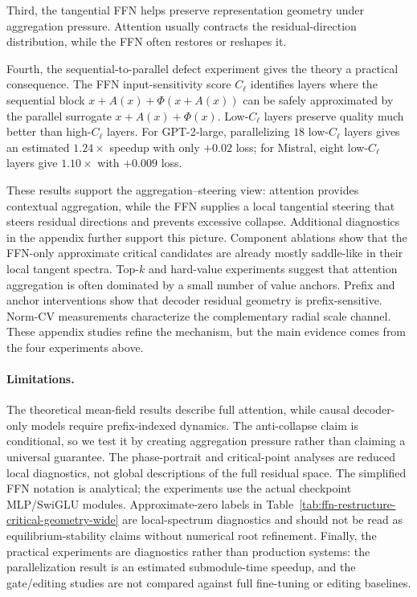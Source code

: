 \documentclass[11pt]{article}
\begin{document}
Third, the tangential FFN helps preserve representation geometry under
aggregation pressure. Attention usually contracts the residual-direction
distribution, while the FFN often restores or reshapes it.

Fourth, the sequential-to-parallel defect experiment gives the theory a practical
consequence. The FFN input-sensitivity score $C_\ell$ identifies layers where the
sequential block
$x+A(x)+\Phi(x+A(x))$ can be safely approximated by the parallel surrogate
$x+A(x)+\Phi(x)$. Low-$C_\ell$ layers preserve quality much better than
high-$C_\ell$ layers. For GPT-2-large, parallelizing $18$ low-$C_\ell$ layers
gives an estimated $1.24\times$ speedup with only $+0.02$ loss; for Mistral,
eight low-$C_\ell$ layers give $1.10\times$ with $+0.009$ loss.

These results support the aggregation--steering view: attention provides
contextual aggregation, while the FFN supplies a local tangential steering that
steers residual directions and prevents excessive collapse. Additional
diagnostics in the appendix further support this picture. Component ablations
show that the FFN-only approximate critical candidates are already mostly
saddle-like in their local tangent spectra. Top-$k$ and hard-value experiments suggest that
attention aggregation is often dominated by a small number of value anchors.
Prefix and anchor interventions show that decoder residual geometry is
prefix-sensitive. Norm-CV measurements characterize the complementary radial
scale channel. These appendix studies refine the mechanism, but the main
evidence comes from the four experiments above.

\paragraph{Limitations.}
The theoretical mean-field results describe full attention, while causal
decoder-only models require prefix-indexed dynamics. The anti-collapse claim is
conditional, so we test it by creating aggregation pressure rather than claiming
a universal guarantee. The phase-portrait and critical-point analyses are
reduced local diagnostics, not global descriptions of the full residual space.
The simplified FFN notation is analytical; the experiments use the actual
checkpoint MLP/SwiGLU modules. Approximate-zero labels in Table~\ref{tab:ffn-restructure-critical-geometry-wide}
are local-spectrum diagnostics and should not be read as equilibrium-stability
claims without numerical root refinement. Finally, the practical experiments are
diagnostics rather than production systems: the parallelization result is an
estimated submodule-time speedup, and the gate/editing studies are not compared
against full fine-tuning or editing baselines.
\end{document}
